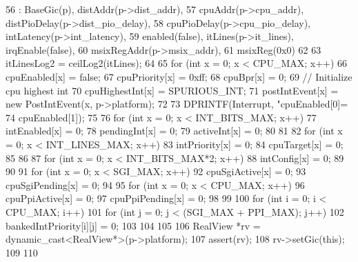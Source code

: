 \begin{DoxyCode}
56     : BaseGic(p), distAddr(p->dist_addr),
57       cpuAddr(p->cpu_addr), distPioDelay(p->dist_pio_delay),
58       cpuPioDelay(p->cpu_pio_delay), intLatency(p->int_latency),
59       enabled(false), itLines(p->it_lines), irqEnable(false),
60       msixRegAddr(p->msix_addr),
61       msixReg(0x0)
62 {
63     itLinesLog2 = ceilLog2(itLines);
64 
65     for (int x = 0; x < CPU_MAX; x++) {
66         cpuEnabled[x] = false;
67         cpuPriority[x] = 0xff;
68         cpuBpr[x] = 0;
69         // Initialize cpu highest int
70         cpuHighestInt[x] = SPURIOUS_INT;
71         postIntEvent[x] = new PostIntEvent(x, p->platform);
72     }
73     DPRINTF(Interrupt, "cpuEnabled[0]=%
74             cpuEnabled[1]);
75 
76     for (int x = 0; x < INT_BITS_MAX; x++) {
77         intEnabled[x] = 0;
78         pendingInt[x] = 0;
79         activeInt[x] = 0;
80     }
81 
82     for (int x = 0; x < INT_LINES_MAX; x++) {
83         intPriority[x] = 0;
84         cpuTarget[x] = 0;
85     }
86 
87     for (int x = 0; x < INT_BITS_MAX*2; x++) {
88         intConfig[x] = 0;
89     }
90 
91     for (int x = 0; x < SGI_MAX; x++) {
92         cpuSgiActive[x] = 0;
93         cpuSgiPending[x] = 0;
94     }
95     for (int x = 0; x < CPU_MAX; x++) {
96         cpuPpiActive[x] = 0;
97         cpuPpiPending[x] = 0;
98     }
99 
100     for (int i = 0; i < CPU_MAX; i++) {
101         for (int j = 0; j < (SGI_MAX + PPI_MAX); j++) {
102             bankedIntPriority[i][j] = 0;
103         }
104     }
105 
106     RealView *rv = dynamic_cast<RealView*>(p->platform);
107     assert(rv);
108     rv->setGic(this);
109 
110 }
\end{DoxyCode}


